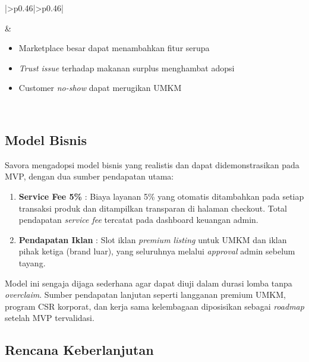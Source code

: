 \begin{table}[htbp]
\begin{tabular}{|>{\RaggedRight\arraybackslash}p{0.46\textwidth}|>{\RaggedRight\arraybackslash}p{0.46\textwidth}|}
\begin{minipage}[t]{\linewidth}
\begin{itemize}[leftmargin=*,nosep]
\end{itemize}
\end{minipage} &
\begin{minipage}[t]{\linewidth}
\begin{itemize}[leftmargin=*,nosep]
    \item Marketplace besar dapat menambahkan fitur serupa
    \item \textit{Trust issue} terhadap makanan surplus menghambat adopsi
    \item Customer \textit{no-show} dapat merugikan UMKM
\end{itemize}
\end{minipage} \\
\hline
\end{tabular}
\end{table}

\subsection{Model Bisnis}

Savora mengadopsi model bisnis yang realistis dan dapat didemonstrasikan pada MVP, dengan dua
sumber pendapatan utama:

\begin{enumerate}[leftmargin=*]
    \item \textbf{Service Fee 5\%} : Biaya layanan 5\% yang otomatis ditambahkan pada setiap transaksi
    produk dan ditampilkan transparan di halaman checkout. Total pendapatan \textit{service fee}
    tercatat pada dashboard keuangan admin.
    \item \textbf{Pendapatan Iklan} : Slot iklan \textit{premium listing} untuk UMKM dan iklan pihak
    ketiga (brand luar), yang seluruhnya melalui \textit{approval} admin sebelum tayang.
\end{enumerate}

Model ini sengaja dijaga sederhana agar dapat diuji dalam durasi lomba tanpa \textit{overclaim}.
Sumber pendapatan lanjutan seperti langganan premium UMKM, program CSR korporat, dan kerja sama
kelembagaan diposisikan sebagai \textit{roadmap} setelah MVP tervalidasi.

\subsection{Rencana Keberlanjutan}

